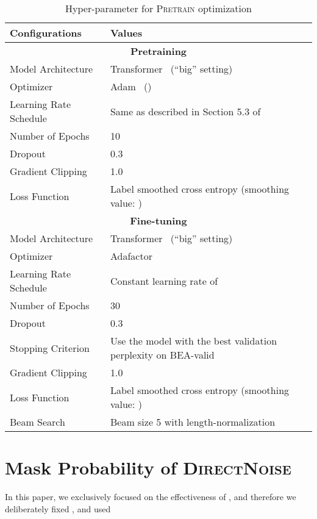 \documentclass[11pt,a4paper]{article}
\newcommand{\directnoise}{\textsc{DirectNoise}}
\newcommand{\pretrain}{\textsc{Pretrain}}
\begin{document}
\begin{table}[h]
\centering
\small
\begin{tabular}{@{}ll@{}}
\toprule
Configurations & Values \\ \midrule
\multicolumn{2}{c}{\textbf{Pretraining}} \\
\midrule
   Model Architecture     &    Transformer~\citep{vaswani:2017:NIPS} (``big'' setting)    \\
   Optimizer              &    Adam~\citep{kingma:2015:ICLR}  ()  \\
   Learning Rate Schedule &    Same as described in Section 5.3 of \citet{vaswani:2017:NIPS}     \\
   Number of Epochs       &    10   \\
   Dropout                &    0.3    \\
   Gradient Clipping      &    1.0    \\
   Loss Function          &    Label smoothed cross entropy (smoothing value: )~\citep{szegedy:2016:rethinking}     \\
\midrule
\multicolumn{2}{c}{\textbf{Fine-tuning}} \\
\midrule
   Model Architecture     &   Transformer~\citep{vaswani:2017:NIPS} (``big'' setting)    \\
   Optimizer              &   Adafactor~\citep{shazeer:2018:adafactor} \\
   Learning Rate Schedule &   Constant learning rate of   \\
   Number of Epochs       &   30   \\
   Dropout                &   0.3    \\
   Stopping Criterion     &   Use the model with the best validation perplexity on BEA-valid \\
   Gradient Clipping      &   1.0    \\
   Loss Function          &   Label smoothed cross entropy (smoothing value: )~\citep{szegedy:2016:rethinking}     \\
   Beam Search            &   Beam size 5 with length-normalization    \\
  \bottomrule
\end{tabular}
\caption{Hyper-parameter for \pretrain{} optimization}
\label{tab:my-table2}
\end{table}

\newpage
\section{Mask Probability of \directnoise{}}
\label{appendix:mask-probability-of-directnoise}
In this paper, we exclusively focused on the effectiveness of , and therefore we deliberately fixed , and used 
\end{document}
